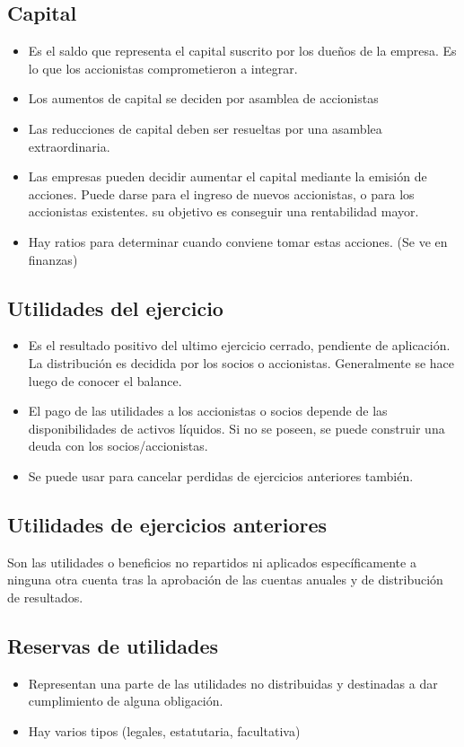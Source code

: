 \documentclass[titlepage,a4paper]{article}
\begin{document}
\subsection*{Capital}
\begin{itemize}
\item Es el saldo que representa el capital suscrito por los dueños de la empresa. Es lo que los accionistas comprometieron a integrar.
\item Los aumentos de capital se deciden por asamblea de accionistas
\item Las reducciones de capital deben ser resueltas por una asamblea extraordinaria.
\item Las empresas pueden decidir aumentar el capital mediante la emisión de acciones. Puede darse para el ingreso de nuevos accionistas, o para los accionistas existentes. su objetivo es conseguir una rentabilidad mayor.
\item Hay ratios para determinar cuando conviene tomar estas acciones. (Se ve en finanzas)
\end{itemize}


\subsection*{Utilidades del ejercicio}

\begin{itemize}
\item Es el resultado positivo del ultimo ejercicio cerrado, pendiente de aplicación. La distribución es decidida por los socios o accionistas. Generalmente se hace luego de conocer el balance.
\item El pago de las utilidades a los accionistas o socios depende de las disponibilidades de activos líquidos. Si no se poseen, se puede construir una deuda con los socios/accionistas.
\item Se puede usar para cancelar perdidas de ejercicios anteriores también.
\end{itemize}


\subsection*{Utilidades de ejercicios anteriores}
Son las utilidades o beneficios no repartidos ni aplicados específicamente a ninguna otra cuenta tras la aprobación de las cuentas anuales y de distribución de resultados.

\subsection*{Reservas de utilidades}
\begin{itemize}
\item Representan una parte de las utilidades no distribuidas y destinadas a dar cumplimiento de alguna obligación.
\item Hay varios tipos (legales, estatutaria, facultativa)
\end{itemize}
\end{document}
